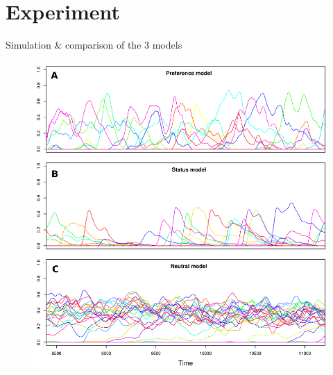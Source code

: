 \documentclass{beamer}
\begin{document}
\section{Experiment}
\begin{frame}{Simulation \& comparison of the 3 models }

	\begin{figure}
		\includegraphics[width=.60\textwidth]{3model.png}
	\end{figure}
	
\end{frame}
\end{document}
